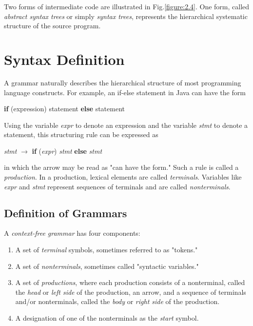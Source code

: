 \documentclass[12pt,a4paper,twoside,openany]{book}
\begin{document}
Two forms of intermediate code are illustrated in Fig.\;\ref{figure:2.4}. One form, called \textit{abstract syntax trees} or simply \textit{syntax trees}, represents the hierarchical systematic structure of the source program.

\section{Syntax Definition}

A grammar naturally describes the hierarchical structure of most programming language constructs. For example, an if-else statement in Java can have the form
\begin{center}
    \textbf{if} (expression) statement \textbf{else} statement
\end{center}

Using the variable \textit{expr} to denote an expression and the variable \textit{stmt} to denote a statement, this structuring rule can be expressed as
\begin{center}
    \textit{stmt} $\rightarrow$ \textbf{if} (\textit{expr}) \textit{stmt} \textbf{else} \textit{stmt}
\end{center}
in which the arrow may be read as "can have the form." Such a rule is called a \textit{production}. In a production, lexical elements are called \textit{terminals}. Variables like \textit{expr} and \textit{stmt} represent sequences of terminals and are called \textit{nonterminals}.

\subsection{Definition of Grammars}

A \textit{context-free grammar} has four components:
\begin{enumerate}
    \item A set of \textit{terminal} symbols, sometimes referred to as "tokens."
    \item A set of \textit{nonterminals}, sometimes called "syntactic variables."
    \item A set of \textit{productions}, where each production consists of a nonterminal, called the \textit{head} or \textit{left side} of the production, an arrow, and a sequence of terminals and/or nonterminals, called the \textit{body} or \textit{right side} of the production.
    \item A designation of one of the nonterminals as the \textit{start} symbol.
\end{enumerate}
\end{document}
